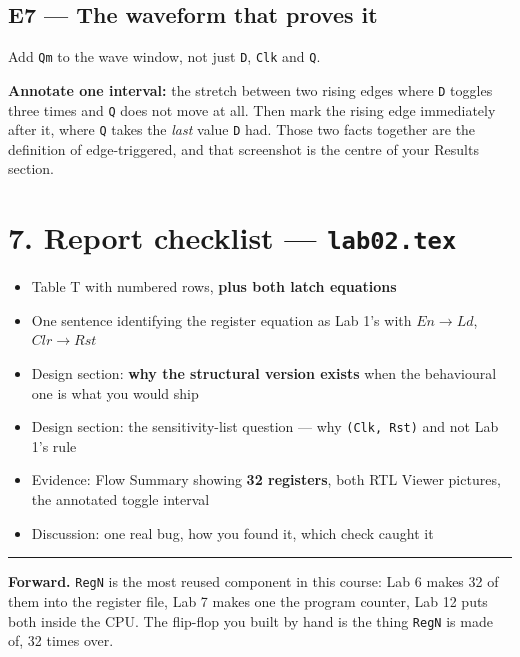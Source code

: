 \documentclass[11pt]{article}
\newcommand{\code}[1]{\texttt{#1}}
\newcommand{\hr}{\vspace{2pt}\hrule\vspace{6pt}}
\begin{document}
\subsection*{E7 --- The waveform that proves it}

Add \code{Qm} to the wave window, not just \code{D}, \code{Clk} and \code{Q}.

\textbf{Annotate one interval:} the stretch between two rising edges where
\code{D} toggles three times and \code{Q} does not move at all. Then mark the
rising edge immediately after it, where \code{Q} takes the \emph{last} value
\code{D} had. Those two facts together are the definition of edge-triggered, and
that screenshot is the centre of your Results section.

\section*{7. Report checklist --- \code{lab02.tex}}

\begin{itemize}[leftmargin=1.6em,itemsep=1pt]
\item Table T with numbered rows, \textbf{plus both latch equations}
\item One sentence identifying the register equation as Lab 1's with
$En \to Ld$, $Clr \to Rst$
\item Design section: \textbf{why the structural version exists} when the
behavioural one is what you would ship
\item Design section: the sensitivity-list question --- why \code{(Clk, Rst)} and
not Lab 1's rule
\item Evidence: Flow Summary showing \textbf{32 registers}, both RTL Viewer
pictures, the annotated toggle interval
\item Discussion: one real bug, how you found it, which check caught it
\end{itemize}

\vspace{6pt}
\hr
{\small \textbf{Forward.} \code{RegN} is the most reused component in this course:
Lab 6 makes 32 of them into the register file, Lab 7 makes one the program
counter, Lab 12 puts both inside the CPU. The flip-flop you built by hand is the
thing \code{RegN} is made of, 32 times over.}
\end{document}
